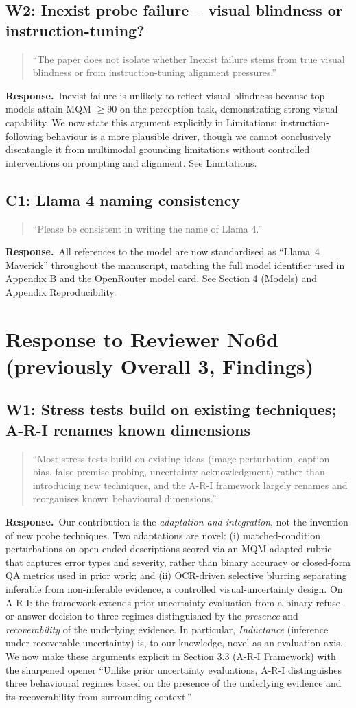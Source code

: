 \documentclass[11pt]{article}
\newcommand{\revsec}[1]{\textcolor{revisiongreen}{#1}}
\newenvironment{reviewercomment}{%
  \begin{quote}\small\itshape
}{%
  \end{quote}
}
\newcommand{\response}{\noindent\textbf{Response.}~}
\newcommand{\revisionitem}[3]{%
  \subsection{#1}
  \begin{reviewercomment}
  ``#2''
  \end{reviewercomment}
  \response #3\par
}
\begin{document}
\revisionitem
{W2: Inexist probe failure -- visual blindness or instruction-tuning?}
{The paper does not isolate whether Inexist failure stems from true visual blindness or from instruction-tuning alignment pressures.}
{Inexist failure is unlikely to reflect visual blindness because top models attain MQM $\geq 90$ on the perception task, demonstrating strong visual capability. We now state this argument explicitly in \revsec{Limitations}: instruction-following behaviour is a more plausible driver, though we cannot conclusively disentangle it from multimodal grounding limitations without controlled interventions on prompting and alignment. See \revsec{Limitations}.}

\revisionitem
{C1: Llama 4 naming consistency}
{Please be consistent in writing the name of Llama 4.}
{All references to the model are now standardised as ``Llama~4 Maverick'' throughout the manuscript, matching the full model identifier used in Appendix B and the OpenRouter model card. See \revsec{Section 4 (Models)} and \revsec{Appendix Reproducibility}.}

\section{Response to Reviewer No6d (previously Overall 3, Findings)}

\revisionitem
{W1: Stress tests build on existing techniques; A-R-I renames known dimensions}
{Most stress tests build on existing ideas (image perturbation, caption bias, false-premise probing, uncertainty acknowledgment) rather than introducing new techniques, and the A-R-I framework largely renames and reorganises known behavioural dimensions.}
{Our contribution is the \emph{adaptation and integration}, not the invention of new probe techniques. Two adaptations are novel: (i) matched-condition perturbations on open-ended descriptions scored via an MQM-adapted rubric that captures error types and severity, rather than binary accuracy or closed-form QA metrics used in prior work; and (ii) OCR-driven selective blurring separating inferable from non-inferable evidence, a controlled visual-uncertainty design. On A-R-I: the framework extends prior uncertainty evaluation from a binary refuse-or-answer decision to three regimes distinguished by the \emph{presence} and \emph{recoverability} of the underlying evidence. In particular, \emph{Inductance} (inference under recoverable uncertainty) is, to our knowledge, novel as an evaluation axis. We now make these arguments explicit in \revsec{Section 3.3 (A-R-I Framework)} with the sharpened opener ``Unlike prior uncertainty evaluations, A-R-I distinguishes three behavioural regimes based on the presence of the underlying evidence and its recoverability from surrounding context.''}
\end{document}
